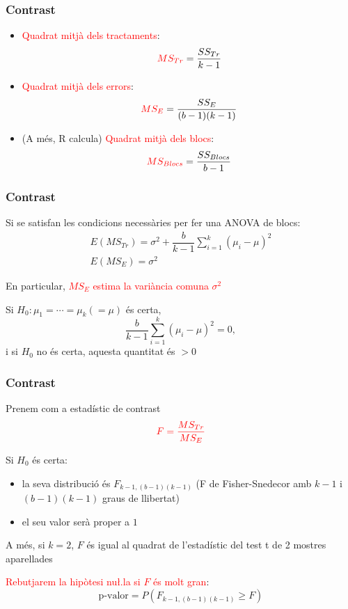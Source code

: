 \documentclass[12pt,t]{beamer}
\newcommand{\red}[1]{\textcolor{red}{#1}}
\renewcommand{\emph}[1]{{\color{red}#1}}
\renewcommand{\geq}{\geqslant}
\theoremstyle{plain}
\theoremstyle{definition}
\begin{document}
\begin{frame}
\frametitle{Contrast}\vspace*{-1ex} 

\begin{itemize}
\item \red{Quadrat mitjà dels tractaments}: 
$$
\red{MS_{Tr}}=\dfrac{SS_{Tr}}{k-1}
$$


\item \red{Quadrat mitjà dels errors}: 
$$
\red{MS_E} = \dfrac{SS_E}{(b-1) (k-1)}
$$


\item (A més, R calcula) \red{Quadrat mitjà dels blocs}:
$$
\red{MS_{Blocs}}=\dfrac{SS_{Blocs}}{b-1}
$$
\end{itemize}
\end{frame}



\begin{frame}
\frametitle{Contrast}

Si se satisfan les condicions necessàries per fer una ANOVA de blocs:
$$
\begin{array}{l}
\displaystyle E(MS_{Tr})=\sigma^2 + \dfrac{b}{k-1}\sum_{i=1}^k (\mu_{i}-\mu)^2 \\
E(MS_E)=\sigma^2
\end{array}
$$


En particular, \red{$MS_E$ estima la variància comuna $\sigma^2$}
\medskip

Si $H_0:\mu_{1}=\cdots =\mu_{k}(=\mu)$ és certa,
$$
\dfrac{b}{k-1}\sum\limits_{i=1}^k (\mu_{i}-\mu)^2 = 0,
$$
i si $H_0$ no és certa, aquesta quantitat és $>0$
\end{frame}


\begin{frame}
\frametitle{Contrast}

Prenem com a \emph{estadístic de contrast} 
$$
\red{F=\frac{MS_{Tr}}{MS_E}}
$$

Si $H_0$ és certa:
\medskip

\begin{itemize}
\item la seva distribució és $F_{k-1,(b-1)(k-1)}$ (F de Fisher-Snedecor 
amb $k-1$ i $(b-1)(k-1)$ graus de llibertat)
\medskip

\item el seu valor serà proper a $1$
\end{itemize}
\medskip

A més, si $k=2$, $F$ és igual al quadrat de l'estadístic del test t de 2 mostres aparellades\medskip

\red{Rebutjarem la hipòtesi nu\l.la si $F$ és molt gran}:
$$
\text{p-valor}=P(F_{k-1,(b-1)(k-1)}\geq F)
$$



\end{frame}
\end{document}
